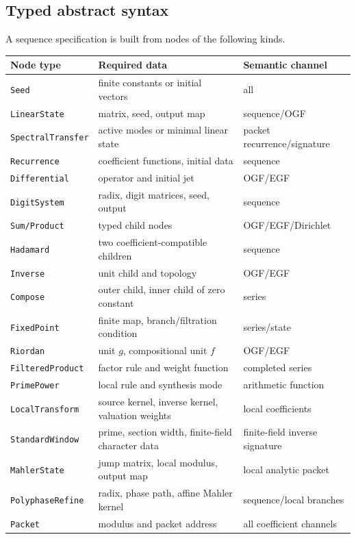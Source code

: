 \documentclass[11pt]{article}
\theoremstyle{definition}\newtheorem{definition}[theorem]{Definition}\newtheorem{example}[theorem]{Example}\newtheorem{construction}[theorem]{Construction}\newtheorem{algorithm}[theorem]{Algorithm}\newtheorem{conjecture}[theorem]{Conjecture}\newtheorem{problem}[theorem]{Problem}
\theoremstyle{remark}\newtheorem{remark}[theorem]{Remark}\newtheorem{boundary}[theorem]{Boundary}\newtheorem{certificate}[theorem]{Computational Certificate}\newtheorem{classical}[theorem]{Classical Input}\newtheorem{principle}[theorem]{Structural Principle}
\begin{document}
\subsection{Typed abstract syntax}
A sequence specification is built from nodes of the following kinds.
\begin{center}
\begin{tabularx}{\textwidth}{L{.2\textwidth}Y L{.25\textwidth}}
\toprule
Node type&Required data&Semantic channel\\
\midrule
\texttt{Seed}&finite constants or initial vectors&all\\
\texttt{LinearState}&matrix, seed, output map&sequence/OGF\\
\texttt{SpectralTransfer}&active modes or minimal linear state&packet recurrence/signature\\
\texttt{Recurrence}&coefficient functions, initial data&sequence\\
\texttt{Differential}&operator and initial jet&OGF/EGF\\
\texttt{DigitSystem}&radix, digit matrices, seed, output&sequence\\
\texttt{Sum/Product}&typed child nodes&OGF/EGF/Dirichlet\\
\texttt{Hadamard}&two coefficient-compatible children&sequence\\
\texttt{Inverse}&unit child and topology&OGF/EGF\\
\texttt{Compose}&outer child, inner child of zero constant&series\\
\texttt{FixedPoint}&finite map, branch/filtration condition&series/state\\
\texttt{Riordan}&unit $g$, compositional unit $f$&OGF/EGF\\
\texttt{FilteredProduct}&factor rule and weight function&completed series\\
\texttt{PrimePower}&local rule and synthesis mode&arithmetic function\\
\texttt{LocalTransform}&source kernel, inverse kernel, valuation weights&local coefficients\\
\texttt{StandardWindow}&prime, section width, finite-field character data&finite-field inverse signature\\
\texttt{MahlerState}&jump matrix, local modulus, output map&local analytic packet\\
\texttt{PolyphaseRefine}&radix, phase path, affine Mahler kernel&sequence/local branches\\
\texttt{Packet}&modulus and packet address&all coefficient channels\\
\bottomrule
\end{tabularx}
\end{center}
\end{document}
